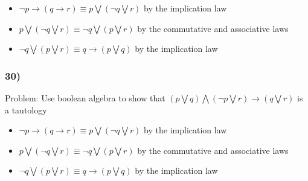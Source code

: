\documentclass{article}
\begin{document}
\begin{itemize}
	\item $\neg p \rightarrow (q \rightarrow r) \equiv p \bigvee (\neg q \bigvee r)$ by the implication law
	\item $p \bigvee (\neg q \bigvee r) \equiv \neg q \bigvee (p \bigvee r)$ by the commutative and associative laws
	\item $\neg q \bigvee (p \bigvee r) \equiv q \rightarrow (p \bigvee q)$ by the implication law 
\end{itemize}
\subsubsection*{30)}
Problem: Use boolean algebra to show that $(p \bigvee q) \bigwedge (\neg p \bigvee r) \rightarrow (q \bigvee r)$ is a tautology

\begin{itemize}
	\item $\neg p \rightarrow (q \rightarrow r) \equiv p \bigvee (\neg q \bigvee r)$ by the implication law
	\item $p \bigvee (\neg q \bigvee r) \equiv \neg q \bigvee (p \bigvee r)$ by the commutative and associative laws
	\item $\neg q \bigvee (p \bigvee r) \equiv q \rightarrow (p \bigvee q)$ by the implication law 
\end{itemize}
\end{document}
